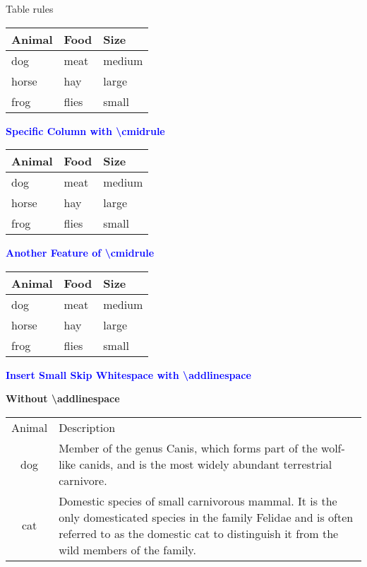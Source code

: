 \documentclass{article}
\begin{document}
Table rules

\begin{tabular}{lll}
    \toprule
    Animal  & Food  & Size      \\
    \midrule
    dog     & meat  & medium    \\
    horse   & hay   & large     \\
    frog    & flies & small     \\
    \bottomrule
\end{tabular}

\textcolor{blue}{\textbf{Specific Column with \textbackslash cmidrule}}

\begin{tabular}{*{3}{l}}
    \toprule
    Animal  & Food  & Size      \\
    \midrule
    dog     & meat  & medium    \\
    \cmidrule{1-2}
    horse   & hay   & large     \\
    \cmidrule{1-1}
    \cmidrule{3-3}
    frog    & flies & small     \\
    \bottomrule
\end{tabular}

\textcolor{blue}{\textbf{Another Feature of \textbackslash cmidrule}}

\begin{tabular}{*{3}{l}}
    \toprule
    Animal  & Food  & Size      \\
    \midrule
    dog     & meat  & medium    \\
    \cmidrule{1-2}
    horse   & hay   & large     \\
    \cmidrule(r){1-1}
    \cmidrule(rl){2-2}
    \cmidrule(l){3-3}
    frog    & flies & small     \\
    \bottomrule
\end{tabular}

\textcolor{blue}{\textbf{Insert Small Skip Whitespace with \textbackslash addlinespace}}

\textbf{Without \textbackslash addlinespace}

\begin{tabular}{cp{9cm}}
    Animal  & Description   \\
    dog     & Member of the genus Canis, which forms part of the wolf-like 
              canids, and is the most widely abundant terrestrial carnivore. \\
    cat     & Domestic species of small carnivorous mammal. It is the only
              domesticated species in the family Felidae and is often referred
              to as the domestic cat to distinguish it from the wild members of
              the family. \\
\end{tabular}
\end{document}
